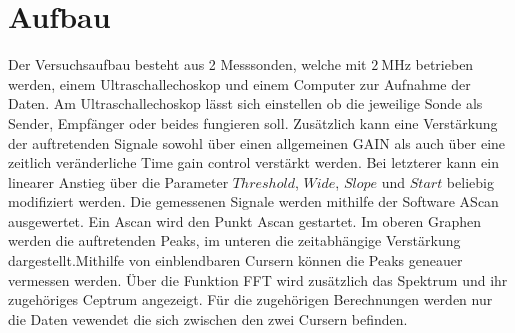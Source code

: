\section{Aufbau}
\label{sec:Aufbau}
Der Versuchsaufbau besteht aus 2 Messsonden, welche mit $\SI{2}{\mega\hertz}$
betrieben werden, einem Ultraschallechoskop und einem Computer zur Aufnahme der Daten.
Am Ultraschallechoskop lässt sich einstellen ob die jeweilige Sonde als Sender,
Empfänger oder beides fungieren soll. Zusätzlich kann eine Verstärkung der
auftretenden Signale sowohl über einen allgemeinen GAIN als auch über eine zeitlich
veränderliche Time gain control verstärkt werden. Bei letzterer kann ein linearer
Anstieg über die Parameter $Threshold$, $Wide$, $Slope$ und $Start$ beliebig
modifiziert werden. Die gemessenen Signale werden mithilfe der
Software AScan ausgewertet. Ein Ascan wird den Punkt Ascan gestartet. Im oberen
Graphen werden die auftretenden Peaks, im unteren die zeitabhängige Verstärkung
dargestellt.Mithilfe von einblendbaren Cursern können die Peaks geneauer vermessen
werden. Über die Funktion FFT wird zusätzlich das Spektrum und ihr zugehöriges
Ceptrum angezeigt. Für die zugehörigen Berechnungen werden nur die Daten vewendet
die sich zwischen den zwei Cursern befinden. 
